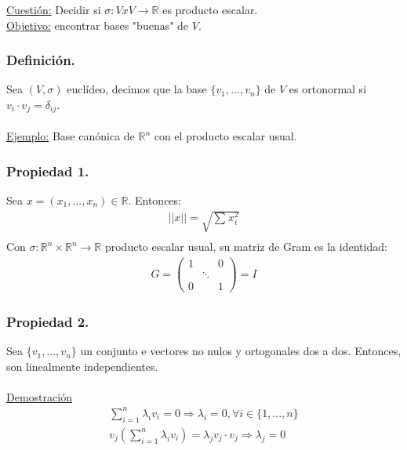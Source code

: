 \documentclass[12pt, a4paper, ones, notitlepage, openany,titlepage]{article}
\begin{document}
\begin{enumerate}
	\underline{Cuestión:} Decidir si $\sigma : VxV \longrightarrow \mathbb{R}$ es producto escalar.\\
	\underline{Objetivo:} encontrar bases "buenas" de $V$.
\end{enumerate}

\subsubsection{Definición.} Sea $(V,\sigma)$ euclídeo, decimos que la base $\{v_{1},...,v_{n}\}$ de $V$ es ortonormal si \\ $v_{i} \cdot v_{j} = \delta_{ij}$.\\\\
\underline{Ejemplo:} Base canónica de $\mathbb{R}^{n}$ con el producto escalar usual.

\subsubsection{Propiedad 1.}
Sea $x = (x_1,...,x_n) \in \mathbb{R}$. Entonces:
\begin{align*}
	||x|| = \sqrt{\sum_{}^{}x_i^2}\\
\end{align*}
Con $\sigma: \mathbb{R}^n \times \mathbb{R}^n \longrightarrow \mathbb{R}$ producto escalar usual, su matriz de Gram es la identidad:
\begin{align*}
	G = \left(
	\begin{matrix}
		1 &        & 0 \\
		& \ddots &   \\
		0 &        & 1
	\end{matrix}
	\right) = I
\end{align*}

\subsubsection{Propiedad 2.}
Sea $\{v_1,...,v_n\}$ un conjunto e vectores no nulos y ortogonales dos a dos. Entonces, son linealmente independientes.\\\\
\underline{Demostración}
\begin{align*}
	\sum_{i=1}^{n} \lambda_i v_i = 0 \Longrightarrow \lambda_i = 0, \forall i \in \{1,...,n\}\\
	v_j \left( \sum_{i=1}^{n} \lambda_i v_i \right) = \lambda_j v_j \cdot v_j \Longrightarrow \lambda_j = 0
\end{align*}
\end{document}
